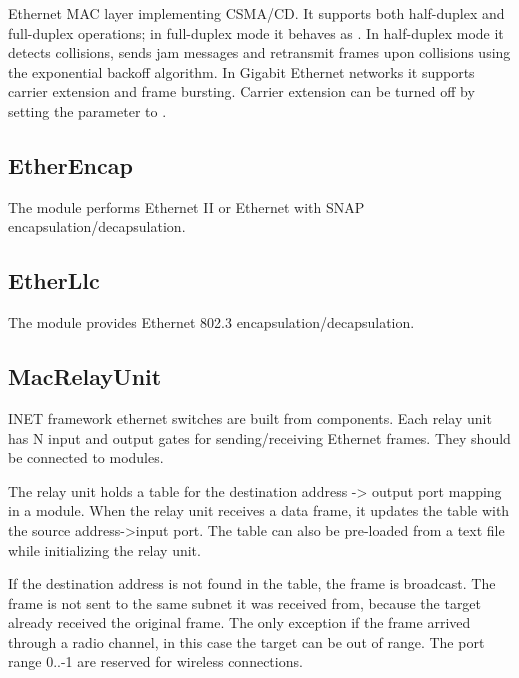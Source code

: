 Ethernet MAC layer implementing CSMA/CD. It supports both half-duplex and full-duplex operations;
in full-duplex mode it behaves as . In half-duplex mode
it detects collisions, sends jam messages and retransmit frames upon collisions using
the exponential backoff algorithm. In Gigabit Ethernet networks it supports carrier
extension and frame bursting. Carrier extension can be turned off by setting the
 parameter to .

\subsection{EtherEncap}
\label{sec:ethernet:etherencap}

The  module performs Ethernet II or Ethernet with SNAP
encapsulation/decapsulation.

\subsection{EtherLlc}
\label{sec:ethernet:etherllc}

The  module provides Ethernet 802.3
encapsulation/decapsulation.

\subsection{MacRelayUnit}
\label{sec:ethernet:macrelayunit}

INET framework ethernet switches are built from 
components. Each relay unit has N input and output gates for sending/receiving
Ethernet frames. They should be connected to  modules.

The relay unit holds a table for the destination address -> output port mapping
in a  module.  When the relay unit receives a data frame, it
updates the table with the source address->input port. The table can also be
pre-loaded from a text file while initializing the relay unit.

If the destination address is not found in the table, the frame is broadcast.
The frame is not sent to the same subnet it was received from, because the
target already received the original frame. The only exception if the frame
arrived through a radio channel, in this case the target can be out of range.
The port range 0..-1 are reserved for wireless connections.

